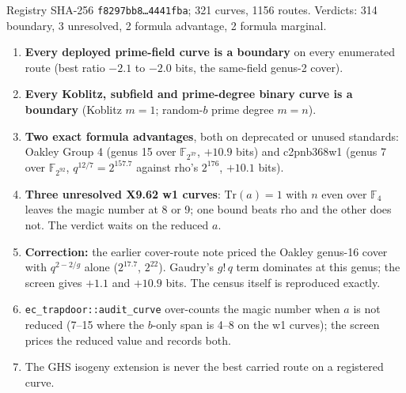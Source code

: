 \noindent Registry SHA-256 \texttt{f8297bb8\ldots4441fba}; 321 curves, 1156 routes.
Verdicts: 314 boundary, 3 unresolved, 2 formula advantage, 2 formula marginal.

\medskip
{}

\begin{enumerate}
\item \textbf{Every deployed prime-field curve is a boundary} on every enumerated route (best ratio $-2.1$ to $-2.0$ bits, the same-field genus-2 cover).
\item \textbf{Every Koblitz, subfield and prime-degree binary curve is a boundary} (Koblitz $m=1$; random-$b$ prime degree $m=n$).
\item \textbf{Two exact formula advantages}, both on deprecated or unused standards: Oakley Group 4 (genus 15 over $\mathbb F_{2^{37}}$, $+10.9$ bits) and c2pnb368w1 (genus 7 over $\mathbb F_{2^{92}}$, $q^{12/7}=2^{157.7}$ against rho's $2^{176}$, $+10.1$ bits).
\item \textbf{Three unresolved X9.62 w1 curves}: $\mathrm{Tr}(a)=1$ with $n$ even over $\mathbb F_4$ leaves the magic number at 8 or 9; one bound beats rho and the other does not. The verdict waits on the reduced $a$.
\item \textbf{Correction:} the earlier cover-route note priced the Oakley genus-16 cover with $q^{2-2/g}$ alone ($2^{17.7}$, $2^{22}$). Gaudry's $g!\,q$ term dominates at this genus; the screen gives $+1.1$ and $+10.9$ bits. The census itself is reproduced exactly.
\item \texttt{ec\_trapdoor::audit\_curve} over-counts the magic number when $a$ is not reduced (7--15 where the $b$-only span is 4--8 on the w1 curves); the screen prices the reduced value and records both.
\item The GHS isogeny extension is never the best carried route on a registered curve.
\end{enumerate}

